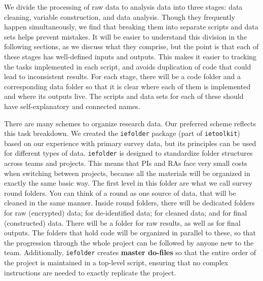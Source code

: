 We divide the processing of raw data to analysis data into three stages:
data cleaning, variable construction, and data analysis.
Though they frequently happen simultaneously,
we find that breaking them into separate scripts and data sets helps prevent mistakes.
It will be easier to understand this division in the following sections,
as we discuss what they comprise,
but the point is that each of these stages has well-defined inputs and outputs.
This makes it easier to tracking the tasks implemented in each script,
and avoids duplication of code that could lead to inconsistent results.
For each stage, there will be a code folder and a corresponding data folder
so that it is clear where each of them is implemented and where its outputs live.
The scripts and data sets for each of these should have self-explanatory and connected names.

There are many schemes to organize research data.
Our preferred scheme reflects this task breakdown.
We created the \texttt{iefolder}
package (part of \texttt{ietoolkit})
based on our experience with primary survey data,
but its principles can be used for different types of data.
\texttt{iefolder} is designed to standardize folder structures across teams and projects.
This means that PIs and RAs face very small costs
when switching between projects, because all the materials
will be organized in exactly the same basic way.
The first level in this folder are what we call survey round folders.
You can think of a round as one source of data,
that will be cleaned in the same manner.
Inside round folders, there will be dedicated folders for raw (encrypted) data;
for de-identified data; for cleaned data; and for final (constructed) data.
There will be a folder for raw results, as well as for final outputs.
The folders that hold code will be organized in parallel to these,
so that the progression through the whole project can be followed
by anyone new to the team. 
Additionally, \texttt{iefolder} creates \textbf{master do-files}
so that the entire order of the project is maintained in a top-level script,
ensuring that no complex instructions are needed
to exactly replicate the project.

